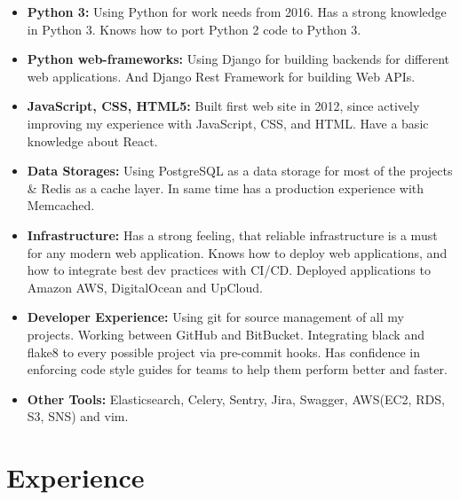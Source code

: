 \documentclass[10.1pt,a4paper,sans]{moderncv}        %
\begin{document}
\begin{itemize}
    \item \textbf{Python 3:} Using Python for work needs from 2016. Has a strong knowledge in Python 3. Knows how to port Python 2 code to Python 3.
    \item \textbf{Python web-frameworks:} Using Django for building backends for different web applications. And Django Rest Framework for building Web APIs.
    \item \textbf{JavaScript, CSS, HTML5:} Built first web site in 2012, since actively improving my experience with JavaScript, CSS, and HTML. Have a basic knowledge about React.
    \item \textbf{Data Storages:} Using PostgreSQL as a data storage for most of the projects \& Redis as a cache layer. In same time has a production experience with Memcached.
    \item \textbf{Infrastructure:} Has a strong feeling, that reliable infrastructure is a must for any modern web application. Knows how to deploy web applications, and how to integrate best dev practices with CI/CD.
    Deployed applications to Amazon AWS, DigitalOcean and UpCloud.
    \item \textbf{Developer Experience:} Using git for source management of all my projects. Working between GitHub and BitBucket. Integrating black and flake8 to every possible project via pre-commit hooks. Has confidence in enforcing code style guides for teams to help them perform better and faster.
    \item \textbf{Other Tools:} Elasticsearch, Celery, Sentry, Jira, Swagger, AWS(EC2, RDS, S3, SNS) and vim.
\end{itemize}

\section{Experience}

\vspace{3pt}
\end{document}
